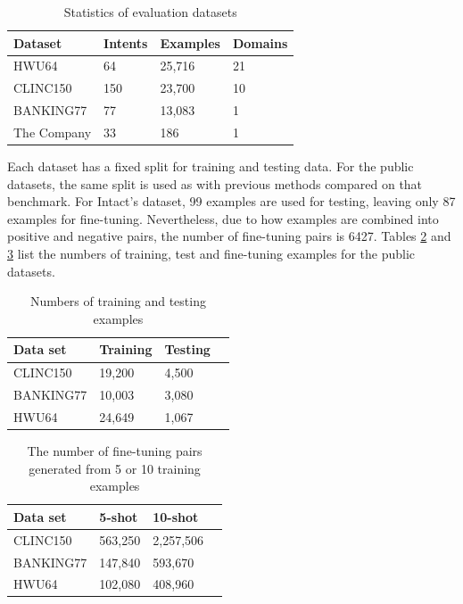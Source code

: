 \documentclass[sigconf, anonymous=true]{acmart}
\begin{document}
\begin{table}[h]
\setlength{} %
\footnotesize\centering
\begin{tabular}{llll}
\hline \textbf{Dataset} & \textbf{Intents} & \textbf{Examples} & \textbf{Domains} \\
\hline HWU64 & 64 & 25,716 & 21 \\
CLINC150 & 150 & 23,700& 10 \\
BANKING77 & 77 & 13,083 & 1 \\
The Company & 33 & 186 & 1 \\
\hline
\end{tabular}
\caption{Statistics of evaluation datasets}
\label{tab:freq}
\end{table}
 
Each dataset has a fixed split for training and testing data. For the public datasets, the same split is used as with previous methods compared on that benchmark. For Intact's dataset, 99 examples are used for testing, leaving only 87 examples for fine-tuning. Nevertheless, due to how examples are combined into positive and negative pairs, the number of fine-tuning pairs is 6427. Tables \ref{tab:NumTrainTest} and \ref{tab:NumFineTuning} list the numbers of training, test and fine-tuning examples for the public datasets. 

\begin{table}[H]
\setlength{} %
\footnotesize\centering
\begin{tabular}{llll}
\hline \textbf{Data set} & \textbf{Training} & \textbf{Testing} \\
\hline CLINC150 & 19,200 & 4,500  \\
BANKING77 & 10,003 & 3,080  \\
HWU64 & 24,649 & 1,067  \\
\hline
\end{tabular}
\caption{Numbers of training and testing examples}
\label{tab:NumTrainTest}
\end{table}

\begin{table}[H]
\setlength{} %
\footnotesize\centering
\begin{tabular}{llll}
\hline \textbf{Data set} & \textbf{5-shot} & \textbf{10-shot}\\
\hline CLINC150 & 563,250 & 2,257,506 \\
BANKING77 & 147,840 & 593,670  \\
HWU64 & 102,080 & 408,960  \\
\hline
\end{tabular}
\caption{The number of fine-tuning pairs generated from 5 or 10 training examples}
\label{tab:NumFineTuning}
\end{table}
\end{document}
